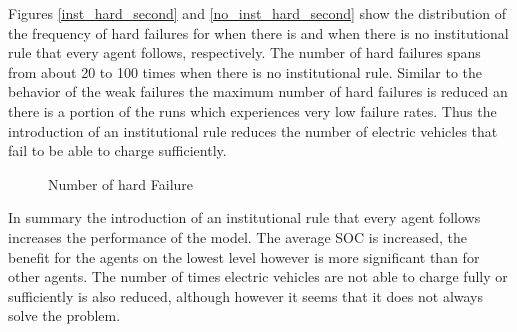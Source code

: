 \documentclass[a4paper]{article}
\begin{document}
Figures \ref{inst_hard_second} and \ref{no_inst_hard_second}  show the distribution of the frequency of hard failures  for 
when there is and when there is no institutional rule that every agent follows, respectively. The number of hard failures spans from
about 20 to 100 times when there is no institutional rule. Similar to the behavior of the weak failures the maximum 
number of hard failures is reduced an there is a portion of the runs which experiences very low failure rates. Thus the introduction
of an institutional rule reduces the number of electric vehicles that fail to be able to charge sufficiently. \\
\begin{figure}[!ht]
\caption{Number of hard Failure}
\label{hard_second}
\end{figure}
In summary the introduction of an institutional rule that every agent follows increases the performance of the model. The average SOC
is increased, the benefit for the agents on the lowest level however is more significant than for other agents. The number of times 
electric vehicles are not able to charge fully or sufficiently is also reduced, although however it seems that it does not always 
solve the problem. 
\newpage
\end{document}
